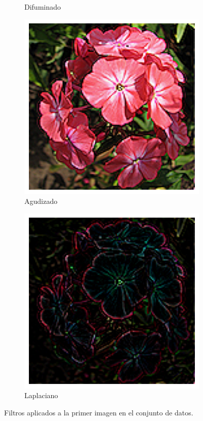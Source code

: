 \documentclass{article}
\begin{document}
\begin{figure}
\begin{subfigure}[b]{0.24\textwidth}
		\caption{Difuminado}
		\label{fg:difuminado}
	\end{subfigure}
	\begin{subfigure}[b]{0.24\textwidth}
		\includegraphics[width= \textwidth]{agudizado}
		\caption{Agudizado}
		\label{fg:agudizado}
	\end{subfigure}
	\begin{subfigure}[b]{0.24\textwidth}
		\includegraphics[width= \textwidth]{laplaciano}
		\caption{Laplaciano}
		\label{fg:laplaciano}
	\end{subfigure}
	\caption{Filtros aplicados a la primer imagen en el conjunto de datos.}
\end{figure}
\end{document}
